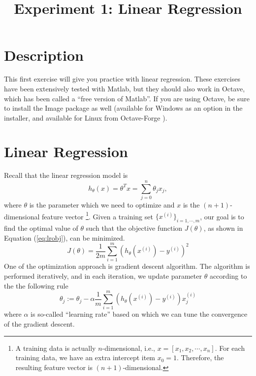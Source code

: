 \documentclass[10pt,a4paper]{article}
\begin{document}
\title{Experiment 1: Linear Regression}

\maketitle
  
\section{Description}
%
  This first exercise will give you practice with linear regression. These exercises have been extensively tested with Matlab, but they should also work in Octave, which has been called a ``free version of Matlab''. If you are using Octave, be sure to install the Image package as well (available for Windows as an option in the installer, and available for Linux from Octave-Forge ).


\section{Linear Regression}
%
  Recall that the linear regression model is 
  \begin{equation}
    h_{\theta}(x) = \theta^Tx = \sum_{j=0}^n \theta_j x_j,
  \label{eq:lrmodel}
  \end{equation}
  where $\theta$ is the parameter which we need to optimize and $x$ is the $(n+1)$-dimensional feature vector \footnote{A training data is actually $n$-dimensional, i.e., $x = [x_1, x_2, \cdots, x_n]$. For each training data, we have an extra intercept item $x_0 = 1$. Therefore, the resulting feature vector is $(n+1)$-dimensional.}. Given a training set $\{x^{(i)}\}_{i=1,\cdots,m}$, our goal is to find the optimal value of $\theta$ such that the objective function $J(\theta)$, as shown in Equation (\ref{eq:lrobj}), can be minimized. 
  \begin{equation}
    J(\theta) = \frac{1}{2m}\sum^m_{i=1} (h_\theta(x^{(i)}) - y^{(i)})^2
  \label{eq:lrobj}
  \end{equation}
  One of the optimization approach is gradient descent algorithm. The algorithm is performed iteratively, and in each iteration, we update parameter $\theta$ according to the the following rule
  \begin{equation}
    \theta_j := \theta_j - \alpha \frac{1}{m} \sum_{i=1}^m (h_\theta(x^{(i)}) - y^{(i)}) x^{(i)}_j 
  \end{equation}
  where $\alpha$ is so-called ``learning rate'' based on which we can tune the convergence of the gradient descent.
\end{document}
